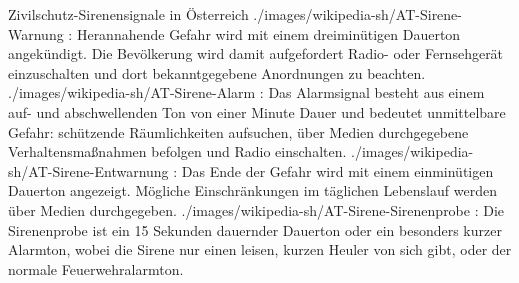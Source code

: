 \begin{PictureSeriesWide}{}{Zivilschutz-Sirenensignale in
Österreich \cite{wiki:zivilschutzsignale20120810}
\label{fig:zvivilschutz-sirenensignale-at}}
{./images/wikipedia-sh/AT-Sirene-Warnung}
{: Herannahende Gefahr wird mit einem
dreiminütigen Dauerton angekündigt. Die Bevölkerung wird
damit aufgefordert Radio- oder Fernsehgerät einzuschalten
und dort bekanntgegebene Anordnungen zu beachten.
}
{./images/wikipedia-sh/AT-Sirene-Alarm}
{: Das Alarmsignal besteht aus einem auf- und
abschwellenden Ton von einer Minute Dauer und bedeutet unmittelbare Gefahr:
schützende Räumlichkeiten aufsuchen, über Medien durchgegebene
Verhaltensmaßnahmen befolgen und Radio
einschalten. 
}
{./images/wikipedia-sh/AT-Sirene-Entwarnung}
{: Das Ende der Gefahr wird mit einem
einminütigen Dauerton angezeigt. Mögliche Einschränkungen im täglichen Lebenslauf
werden über Medien
durchgegeben.
}
{./images/wikipedia-sh/AT-Sirene-Sirenenprobe}
{: Die Sirenenprobe ist ein 15 Sekunden
dauernder Dauerton oder ein besonders kurzer Alarmton, wobei die Sirene nur einen
leisen, kurzen Heuler von sich gibt, oder der normale
Feuerwehralarmton.
}
% 

\end{PictureSeriesWide}

